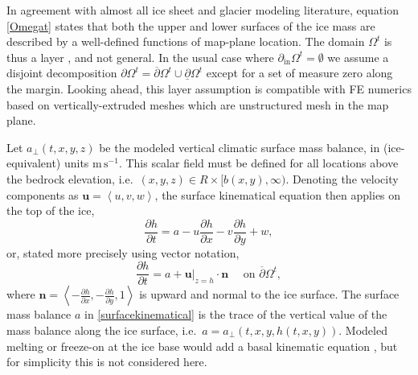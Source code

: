 \documentclass[letterpaper,final,12pt,reqno]{amsart}
\newcommand{\bn}{\mathbf{n}}
\newcommand{\bu}{\mathbf{u}}
\begin{document}
In agreement with almost all ice sheet and glacier modeling literature, equation \eqref{Omegat} states that both the upper and lower surfaces of the ice mass are described by a well-defined functions of map-plane location.  The domain $\Omega^t$ is thus a layer \cite{Bueler2020}, and not general.  In the usual case where $\partial_{\text{in}} \Omega^t=\emptyset$ we assume a disjoint decomposition $\partial \Omega^t = \overline{\partial} \Omega^t \cup \underline{\partial} \Omega^t$ except for a set of measure zero along the margin.  Looking ahead, this layer assumption is compatible with FE numerics based on vertically-extruded meshes which are unstructured mesh in the map plane.

Let $a_\perp(t,x,y,z)$ be the modeled vertical climatic surface mass balance, in (ice-equivalent) units $\text{m}\,\text{s}^{-1}$.  This scalar field must be defined for all locations above the bedrock elevation, i.e.~$(x,y,z) \in R\times[b(x,y),\infty)$.  Denoting the velocity components as $\bu=\left<u,v,w\right>$, the surface kinematical equation \cite{GreveBlatter2009} then applies on the top of the ice,
    $$\frac{\partial h}{\partial t} = a - u \frac{\partial h}{\partial x} - v \frac{\partial h}{\partial y} + w,$$
or, stated more precisely using vector notation,
\begin{equation}
\frac{\partial h}{\partial t} = a + \bu|_{z=h} \cdot \bn \quad \text{ on } \overline{\partial}\Omega^t, \label{surfacekinematical}
\end{equation}
where $\bn = \left<-\frac{\partial h}{\partial x},-\frac{\partial h}{\partial y},1\right>$ is upward and normal to the ice surface.  The surface mass balance $a$ in \eqref{surfacekinematical} is the trace \cite{Evans2010} of the vertical value of the mass balance along the ice surface, i.e.~$a = a_{\perp}(t,x,y,h(t,x,y))$.  Modeled melting or freeze-on at the ice base would add a basal kinematic equation \cite[for example]{Aschwandenetal2012}, but for simplicity this is not considered here.
\end{document}
